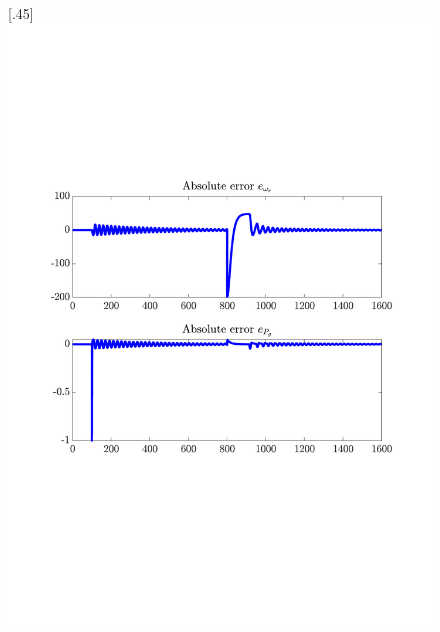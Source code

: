 \begin{figure}[H]
    \centering

    [.45\textwidth]{\includegraphics[width=1\linewidth, scale=1, trim=60 230 55 150,clip]{fig/Open_loop/exp_1_error.pdf}}
%

\end{figure}

